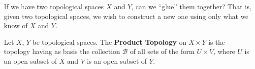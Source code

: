 \begin{prob}
If we have two topological spaces $X$ and $Y$, can we ``glue''
them together? That is, given two topological spaces, we wish to
construct a new one using only what we know of $X$ and $Y$.
\end{prob}

\begin{defn}\label{defn:productTopology}
Let $X$, $Y$ be topological spaces. The \textbf{Product Topology}
on $X\times Y$ is the topology having as basis the collection
$\mathscr{B}$ of all sets of the form $U\times V$, where $U$ is
an open subset of $X$ and $V$ is an open subset of $Y$.
\end{defn}

